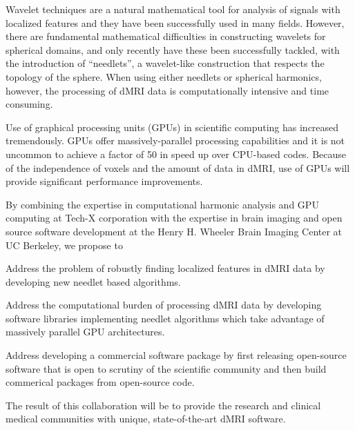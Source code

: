 \documentclass[10pt]{article}
\begin{document}
Wavelet techniques are a natural mathematical tool for analysis of signals with
localized features and they have been successfully used in many fields. However, there
are fundamental mathematical difficulties in constructing wavelets for spherical
domains, and only recently have these been successfully tackled, with the
introduction of ``needlets'', a wavelet-like construction that respects the
topology of the sphere. When using either needlets or spherical harmonics, however, the 
processing of dMRI data is computationally intensive and time consuming.

Use of graphical processing units (GPUs) in scientific computing has
increased tremendously. GPUs offer massively-parallel processing capabilities
and it is not uncommon to achieve a factor of 50 in speed up over CPU-based
codes. Because of the independence of voxels and the amount of data in
dMRI, use of GPUs will provide significant performance improvements.

By combining the expertise in computational harmonic analysis and GPU computing
at Tech-X corporation with the expertise in brain imaging and open source software
development at the Henry H. Wheeler Brain Imaging Center at UC Berkeley, we propose to
\begin{itemize*}
\item{Address the problem of robustly finding localized features in dMRI data by developing new
      needlet based algorithms.}
\item{Address the computational burden of processing dMRI data by developing software
     libraries implementing needlet algorithms which take advantage of massively parallel GPU architectures.}
\item{Address developing a commercial software package by first releasing open-source software that is open to scrutiny
      of the scientific community and then build commerical packages from open-source code.}
\end{itemize*}
The result of this collaboration will be to provide the research and clinical
medical communities with unique, state-of-the-art dMRI software.

\vspace{-8pt}
\end{document}
